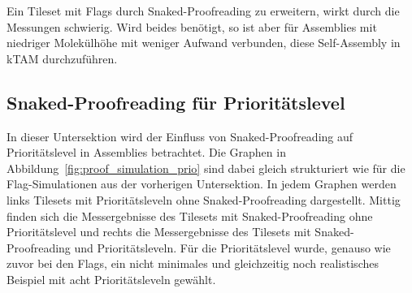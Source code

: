 Ein Tileset mit Flags durch Snaked-Proofreading zu erweitern, wirkt durch die Messungen schwierig. Wird beides benötigt, so ist aber für Assemblies mit niedriger Molekülhöhe mit weniger Aufwand verbunden, diese Self-Assembly in kTAM durchzuführen. 

\subsection{Snaked-Proofreading für Prioritätslevel}

In dieser Untersektion wird der Einfluss von Snaked-Proofreading auf Prioritätslevel in Assemblies betrachtet. Die Graphen in  Abbildung~\ref{fig:proof_simulation_prio} sind dabei gleich strukturiert wie für die Flag-Simulationen aus der vorherigen Untersektion. In jedem Graphen werden links Tilesets mit Prioritätsleveln ohne Snaked-Proofreading dargestellt. Mittig finden sich die Messergebnisse des Tilesets mit Snaked-Proofreading ohne Prioritätslevel und rechts die Messergebnisse des Tilesets mit Snaked-Proofreading und Prioritätsleveln. Für die Prioritätslevel wurde, genauso wie zuvor bei den Flags, ein nicht minimales und gleichzeitig noch realistisches Beispiel mit acht Prioritätsleveln gewählt.

